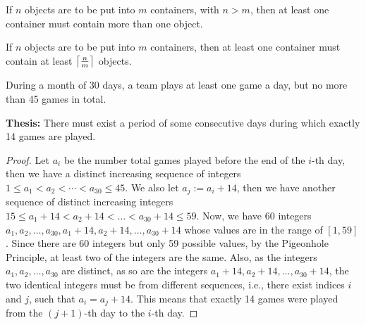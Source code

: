 \begin{theorem}
    If $n$ objects are to be put into $m$ containers, with $n>m$, then at least one container
    must contain more than one object.    
\end{theorem}

\begin{corollary}
    If $n$ objects are to be put into $m$ containers, then at least one container must contain
    at least $\textstyle\left\lceil\frac{n}{m}\right\rceil$ objects.
\end{corollary}

\begin{example}
    During a month of 30 days, a team plays at least one game a day, but no more than 45 games in total.

    \textbf{Thesis:} There must exist a period of some consecutive days during which exactly 14 games are
    played.

    \begin{proof}
        Let $a_i$ be the number total games played before the end of the $i$-th day, then we have
        a distinct increasing sequence of integers $1\leq a_1<a_2<\cdots<a_{30}\leq 45$. We also let
        $a_j := a_i+14$, then we have another sequence of distinct increasing integers
        $15\leq a_1+14<a_2+14<\ldots<a_{30}+14\leq 59$. Now, we have 60 integers $a_1, a_2, \ldots, a_{30},
        a_1+14, a_2+14, \ldots, a_{30}+14$ whose values are in the range of $[1, 59]$. Since there are
        60 integers but only 59 possible values, by the Pigeonhole Principle, at least two of the integers
        are the same. Also, as the integers $a_1, a_2, \ldots, a_30$ are distinct, as so are the integers
        $a_1+14, a_2+14, \ldots, a_{30}+14$, the two identical integers must be from different sequences,
        i.e., there exist indices $i$ and $j$, such that $a_i = a_j + 14$. This means that exactly 14 games
        were played from the $(j+1)$-th day to the $i$-th day.
    \end{proof}
\end{example}